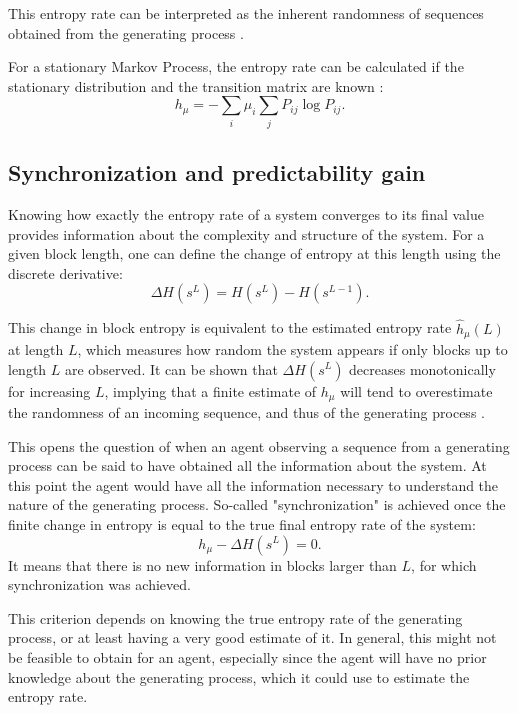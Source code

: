 \documentclass[12pt,a4paper]{article}
\begin{document}
This entropy rate can be interpreted as the inherent randomness of sequences obtained from the generating process \autocite{crutchfield2003regularities}.

For a stationary Markov Process, the entropy rate can be calculated if the stationary distribution and the transition matrix are known \autocite{cover1999elements}:
\begin{equation}
    \label{eq:entropy_rate_MP}
    h_\mu = -\sum_i \mu_i \sum_j P_{ij} \log P_{ij}.
\end{equation}

\subsection{Synchronization and predictability gain} \label{ssec:synch_predgain}
Knowing how exactly the entropy rate of a system converges to its final value provides information about the complexity and structure of the system.
For a given block length, one can define the change of entropy at this length using the discrete derivative:
\begin{equation}
    \label{eq:entropy_change}
    \Delta H(s^L) = H(s^L) - H(s^{L-1}).
\end{equation}

This change in block entropy is equivalent to the estimated entropy rate $\hat{h}_\mu(L)$ at length $L$, which measures how random the system appears if only blocks up to length $L$ are observed.
It can be shown that $\Delta H(s^L)$ decreases monotonically for increasing $L$, implying that a finite estimate of $h_\mu$ will tend to overestimate the randomness of an incoming sequence, and thus of the generating process \autocite{crutchfield2003regularities}.

This opens the question of when an agent observing a sequence from a generating process can be said to have obtained all the information about the system.
At this point the agent would have all the information necessary to understand the nature of the generating process.
So-called "synchronization" is achieved once the finite change in entropy is equal to the true final entropy rate of the system:
\begin{equation}
    \label{eq:synchronisation_equality}
    h_\mu - \Delta H(s^L) = 0.
\end{equation}
It means that there is no new information in blocks larger than $L$, for which synchronization was achieved.

This criterion depends on knowing the true entropy rate of the generating process, or at least having a very good estimate of it.
In general, this might not be feasible to obtain for an agent, especially since the agent will have no prior knowledge about the generating process, which it could use to estimate the entropy rate.
\end{document}
